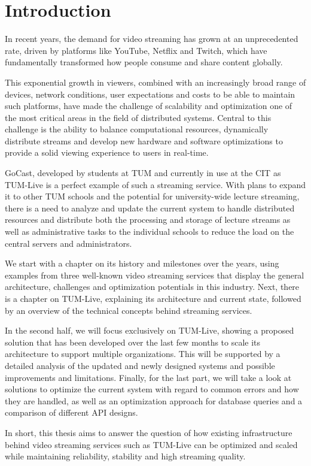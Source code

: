 
\chapter{Introduction}\label{chapter:introduction}

In recent years, the demand for video streaming has grown at an unprecedented rate, driven by platforms like YouTube, Netflix and Twitch, which have fundamentally transformed how people consume and share content globally.

This exponential growth in viewers, combined with an increasingly broad range of devices, network conditions, user expectations and costs to be able to maintain such platforms, have made the challenge of scalability and optimization one of the most critical areas in the field of distributed systems. Central to this challenge is the ability to balance computational resources, dynamically distribute streams and develop new hardware and software optimizations to provide a solid viewing experience to users in real-time.

GoCast, developed by students at \ac{TUM} and currently in use at the \ac{CIT} as TUM-Live is a perfect example of such a streaming service. With plans to expand it to other \ac{TUM} schools and the potential for university-wide lecture streaming, there is a need to analyze and update the current system to handle distributed resources and distribute both the processing and storage of lecture streams as well as administrative tasks to the individual schools to reduce the load on the central servers and administrators.

We start with a chapter on its history and milestones over the years, using examples from three well-known video streaming services that display the general architecture, challenges and optimization potentials in this industry. Next, there is a chapter on TUM-Live, explaining its architecture and current state, followed by an overview of the technical concepts behind streaming services.  

In the second half, we will focus exclusively on TUM-Live, showing a proposed solution that has been developed over the last few months to scale its architecture to support multiple organizations. This will be supported by a detailed analysis of the updated and newly designed systems and possible improvements and limitations. Finally, for the last part, we will take a look at solutions to optimize the current system with regard to common errors and how they are handled, as well as an optimization approach for database queries and a comparison of different \ac{API} designs.    

In short, this thesis aims to answer the question of how existing infrastructure behind video streaming services such as TUM-Live can be optimized and scaled while maintaining reliability, stability and high streaming quality.